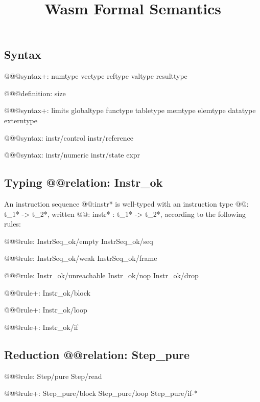 \documentclass[a4paper]{scrartcl}
\title{Wasm Formal Semantics}
\begin{document}
\small

\maketitle


\subsection*{Syntax}

@@@{syntax+: numtype vectype reftype valtype resulttype}

@@@{definition: size}

@@@{syntax+:
  limits
  globaltype
  functype
  tabletype
  memtype
  elemtype
  datatype
  externtype
}

@@@{syntax: instr/control instr/reference}

@@@{syntax: instr/numeric instr/state expr}


\subsection*{Typing @@{relation: Instr_ok}}

An instruction sequence @@{:instr*} is well-typed with an instruction type @@{: t_1* -> t_2*}, written @@{: instr* : t_1* -> t_2*}, according to the following rules:

@@@{rule: InstrSeq_ok/empty InstrSeq_ok/seq}

@@@{rule: InstrSeq_ok/weak InstrSeq_ok/frame}


@@@{rule: Instr_ok/unreachable Instr_ok/nop Instr_ok/drop}

@@@{rule+: Instr_ok/block}

@@@{rule+: Instr_ok/loop}

@@@{rule+: Instr_ok/if}


\subsection*{Reduction @@{relation: Step_pure}}

@@@{rule: Step/pure Step/read}

@@@{rule+: Step_pure/block Step_pure/loop Step_pure/if-*}
\end{document}

